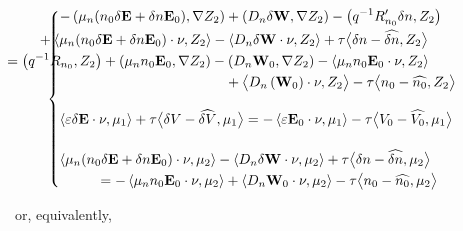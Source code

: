 \documentclass[a4paper,12pt]{article}
\begin{document}
\begin{equation*}
\begin{cases}
\begin{aligned}
  - \left(\mu_n (n_{0} \delta \mathbf{E} + \delta n \mathbf{E}_{0}), \nabla Z_{2} \right) + \left( 
          D_n  \delta \mathbf{W}, \nabla Z_{2} \right)-\left({q^{-1}}R_{n_0}'\delta n, Z_2\right) \\
      & \hspace{-290pt} + \left<\mu_n (n_{0} \delta \mathbf{E} + 
          \delta n \mathbf{E}_{0}) \cdot \nu, Z_{2} \right>  - \left< D_n \delta \mathbf{W} \cdot 
          \nu, Z_{2} \right> + \tau \big< \delta n - \widehat{\delta n}, Z_{2} \big> \\
      & \hspace{-314pt} = \left({q^{-1}}R_{n_0}, Z_2\right) + \left(\mu_n n_{0} 
          \mathbf{E}_{0}, \nabla Z_{2} \right) - \left(D_n\mathbf{W}_{0}, \nabla Z_{2} \right) -
          \left<\mu_n n_{0} \mathbf{E}_{0} \cdot \nu, Z_{2} \right> \\
      & \hspace{-155pt} + \big< D_n 
          \left( \mathbf{W}_{0} \right) \cdot \nu, Z_{2} \big> - \tau \big< n_{0} - 
          \widehat{n_{0}}, Z_{2} \big>
  \end{aligned} \\[35pt]
  \begin{aligned}
  \left<\varepsilon \delta \mathbf{E} \cdot \nu, \mu_{1}\right> + 
      \tau \big< \delta V - \widehat{\delta V}, \mu_{1} \big> = 
      -\left<\varepsilon \mathbf{E}_{0} \cdot \nu, \mu_{1}\right> - \tau \big< V_{0} - 
      \widehat{V_{0}} , \mu_{1} \big>
  \end{aligned} \\[15pt]
  \begin{aligned}
  \left<\mu_n (n_{0} \delta \mathbf{E} + \delta n \mathbf{E}_{0}) \cdot \nu, \mu_{2} \right> - 
      \left<D_n \delta \mathbf{W} \cdot \nu, \mu_{2} \right> + \tau \big< \delta n - 
      \widehat{\delta n}, \mu_{2} \big> \\
  & \hspace{-239.5pt} = - \left<\mu_n n_{0} \mathbf{E}_{0} \cdot \nu, \mu_{2} \right> + \left<D_n 
      \mathbf{W}_{0} \cdot \nu, \mu_{2} \right> - \tau \big< n_{0} - \widehat{n_{0}}, \mu_{2} \big>
  \end{aligned}
 \end{cases}
\end{equation*}

or, equivalently,
\end{document}
